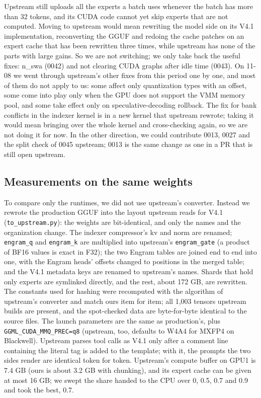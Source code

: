 \documentclass[11pt,a4paper]{article}
\newcommand{\code}[1]{\texttt{#1}}
\begin{document}
Upstream still uploads all the experts a batch uses whenever the batch has more than 32 tokens, and its CUDA code cannot yet skip experts that are not computed. Moving to upstream would mean rewriting the model side on its V4.1 implementation, reconverting the GGUF and redoing the cache patches on an expert cache that has been rewritten three times, while upstream has none of the parts with large gains. So we are not switching; we only take back the useful fixes: n\_swa (0042) and not clearing CUDA graphs after idle time (0043). On 11-08 we went through upstream's other fixes from this period one by one, and most of them do not apply to us: some affect only quantization types with an offset, some come into play only when the GPU does not support the VMM memory pool, and some take effect only on speculative-decoding rollback. The fix for bank conflicts in the indexer kernel is in a new kernel that upstream rewrote; taking it would mean bringing over the whole kernel and cross-checking again, so we are not doing it for now. In the other direction, we could contribute 0013, 0027 and the split check of 0045 upstream; 0013 is the same change as one in a PR that is still open upstream.

\subsection{Measurements on the same weights}
\label{sec:upstreambench}

To compare only the runtimes, we did not use upstream's converter. Instead we rewrote the production GGUF into the layout upstream reads for V4.1 (\code{to\_upstream.py}): the weights are bit-identical, and only the names and the organization change. The indexer compressor's kv and norm are renamed; \code{engram\_q} and \code{engram\_k} are multiplied into upstream's \code{engram\_gate} (a product of BF16 values is exact in F32); the two Engram tables are joined end to end into one, with the Engram heads' offsets changed to positions in the merged table; and the V4.1 metadata keys are renamed to upstream's names. Shards that hold only experts are symlinked directly, and the rest, about 172 GB, are rewritten. The constants used for hashing were recomputed with the algorithm of upstream's converter and match ours item for item; all 1,003 tensors upstream builds are present, and the spot-checked data are byte-for-byte identical to the source files. The launch parameters are the same as production's, plus \code{GGML\_CUDA\_MMQ\_PREC=q8} (upstream, too, defaults to W4A4 for MXFP4 on Blackwell). Upstream parses tool calls as V4.1 only after a comment line containing the literal tag is added to the template; with it, the prompts the two sides render are identical token for token. Upstream's compute buffer on GPU1 is 7.4 GB (ours is about 3.2 GB with chunking), and its expert cache can be given at most 16 GB; we swept the share handed to the CPU over 0, 0.5, 0.7 and 0.9 and took the best, 0.7.
\end{document}
